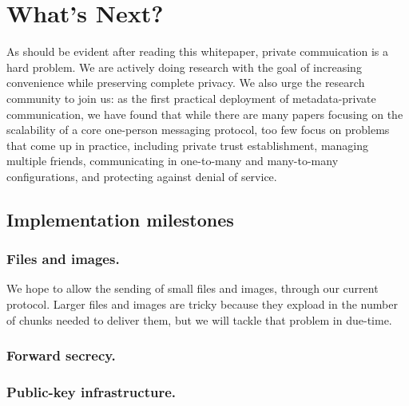 \section{What's Next?}
\label{sec:future}

As should be evident after reading this whitepaper, private commuication is a hard problem. We are actively doing research with the goal of increasing convenience while preserving complete privacy. We also urge the research community to join us: as the first practical deployment of metadata-private communication, we have found that while there are many papers focusing on the scalability of a core one-person messaging protocol, too few focus on problems that come up in practice, including private trust establishment, managing multiple friends, communicating in one-to-many and many-to-many configurations, and protecting against denial of service.


\subsection{Implementation milestones}


\subsubsection{Files and images.} We hope to allow the sending of small files and images, through our current protocol. Larger files and images are tricky because they expload in the number of chunks needed to deliver them, but we will tackle that problem in due-time.

\subsubsection{Forward secrecy.}

\subsubsection{Public-key infrastructure.}

